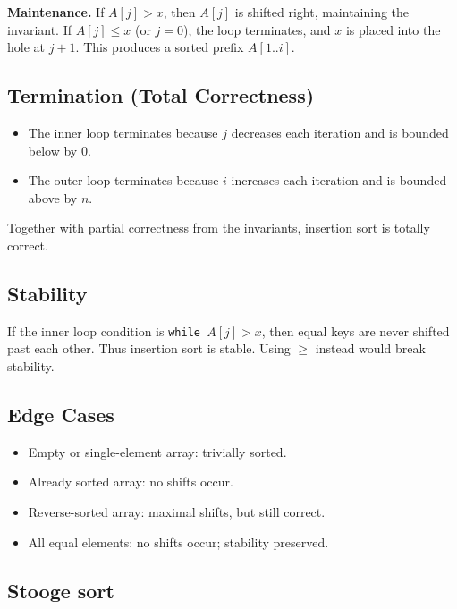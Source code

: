 \documentclass[9pt]{extarticle}
\begin{document}
\textbf{Maintenance.} If $A[j] > x$, then $A[j]$ is shifted right, maintaining the invariant. If $A[j] \leq x$ (or $j=0$), the loop terminates, and $x$ is placed into the hole at $j+1$. This produces a sorted prefix $A[1..i]$.

\subsection*{Termination (Total Correctness)}

\begin{itemize}
    \item The inner loop terminates because $j$ decreases each iteration and is bounded below by $0$.
    \item The outer loop terminates because $i$ increases each iteration and is bounded above by $n$.
\end{itemize}

Together with partial correctness from the invariants, insertion sort is totally correct.

\subsection*{Stability}

If the inner loop condition is \texttt{while $A[j] > x$}, then equal keys are never shifted past each other. Thus insertion sort is stable. Using $\geq$ instead would break stability.

\subsection*{Edge Cases}

\begin{itemize}
    \item Empty or single-element array: trivially sorted.
    \item Already sorted array: no shifts occur.
    \item Reverse-sorted array: maximal shifts, but still correct.
    \item All equal elements: no shifts occur; stability preserved.
\end{itemize}


\subsection{Stooge sort}
\end{document}
